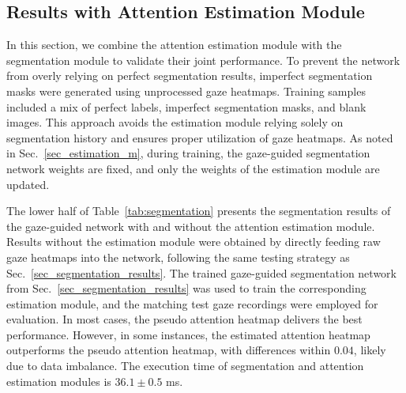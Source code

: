 \subsection{Results with Attention Estimation Module}\label{sec_estimation_results}
In this section, we combine the attention estimation module with the segmentation module to validate their joint performance. 
To prevent the network from overly relying on perfect segmentation results, imperfect segmentation masks were generated using unprocessed gaze heatmaps. Training samples included a mix of perfect labels, imperfect segmentation masks, and blank images. This approach avoids the estimation module relying solely on segmentation history and ensures proper utilization of gaze heatmaps. As noted in Sec.~\ref{sec_estimation_m}, during training, the gaze-guided segmentation network weights are fixed, and only the weights of the estimation module are updated.

\par
The lower half of Table~\ref{tab:segmentation} presents the segmentation results of the gaze-guided network with and without the attention estimation module. Results without the estimation module were obtained by directly feeding raw gaze heatmaps into the network, following the same testing strategy as Sec.~\ref{sec_segmentation_results}. The trained gaze-guided segmentation network from Sec.~\ref{sec_segmentation_results} was used to train the corresponding estimation module, and the matching test gaze recordings were employed for evaluation.
 In most cases, the pseudo attention heatmap delivers the best performance. However, in some instances, the estimated attention heatmap outperforms the pseudo attention heatmap, with differences within $0.04$, likely due to data imbalance. The execution time of segmentation and attention estimation modules is $36.1 \pm 0.5$ ms.







